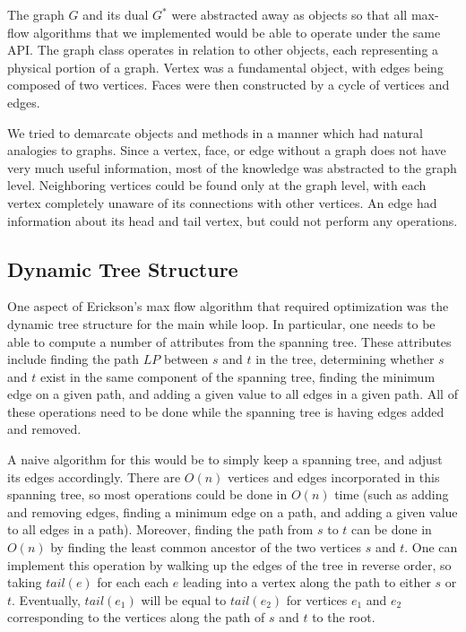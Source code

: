 \documentclass[12pt]{article}
\begin{document}
The graph $G$ and its dual $G^*$ were abstracted away as objects so that all max-flow algorithms that we implemented would be able to operate under the same API. The graph class operates in relation to other objects, each representing a physical portion of a graph. Vertex was a fundamental object, with edges being composed of two vertices. Faces were then constructed by a cycle of vertices and edges. 

We tried to demarcate objects and methods in a manner which had natural analogies to graphs. Since a vertex, face, or edge without a graph does not have very much useful information, most of the knowledge was abstracted to the graph level. Neighboring vertices could be found only at the graph level, with each vertex completely unaware of its connections with other vertices. An edge had information about its head and tail vertex, but could not perform any operations.

\subsection{Dynamic Tree Structure}

One aspect of Erickson's max flow algorithm that required optimization was the dynamic tree structure for the main while loop. In particular, one needs to be able to compute a number of attributes from the spanning tree. These attributes include finding the path $LP$ between $s$ and $t$ in the tree, determining whether $s$ and $t$ exist in the same component of the spanning tree, finding the minimum edge on a given path, and adding a given value to all edges in a given path. All of these operations need to be done while the spanning tree is having edges added and removed. 

A naive algorithm for this would be to simply keep a spanning tree, and adjust its edges accordingly. There are $O(n)$ vertices and edges incorporated in this spanning tree, so most operations could be done in $O(n)$ time (such as adding and removing edges, finding a minimum edge on a path, and adding a given value to all edges in a path). Moreover, finding the path from $s$ to $t$ can be done in $O(n)$ by finding the least common ancestor of the two vertices $s$ and $t$. One can implement this operation by walking up the edges of the tree in reverse order, so taking $tail(e)$ for each each $e$ leading into a vertex along the path to either $s$ or $t$. Eventually, $tail(e_1)$ will be equal to $tail(e_2)$ for vertices $e_1$ and $e_2$ corresponding to the vertices along the path of $s$ and $t$ to the root. 
\end{document}
